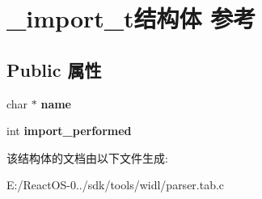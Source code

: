 \hypertarget{struct__import__t}{}\section{\+\_\+import\+\_\+t结构体 参考}
\label{struct__import__t}
\subsection*{Public 属性}
\begin{DoxyCompactItemize}
\item 
\mbox{\label{struct__import__t_a37c377c213081dd55821c7f68bcd1965}} 
char $\ast$ {\bfseries name}
\item 
\mbox{\label{struct__import__t_a41b87e80cb72d5ae090460fcea933ec4}} 
int {\bfseries import\+\_\+performed}
\end{DoxyCompactItemize}


该结构体的文档由以下文件生成\+:\begin{DoxyCompactItemize}
\item 
E\+:/\+React\+O\+S-\/0../sdk/tools/widl/parser.\+tab.\+c\end{DoxyCompactItemize}
